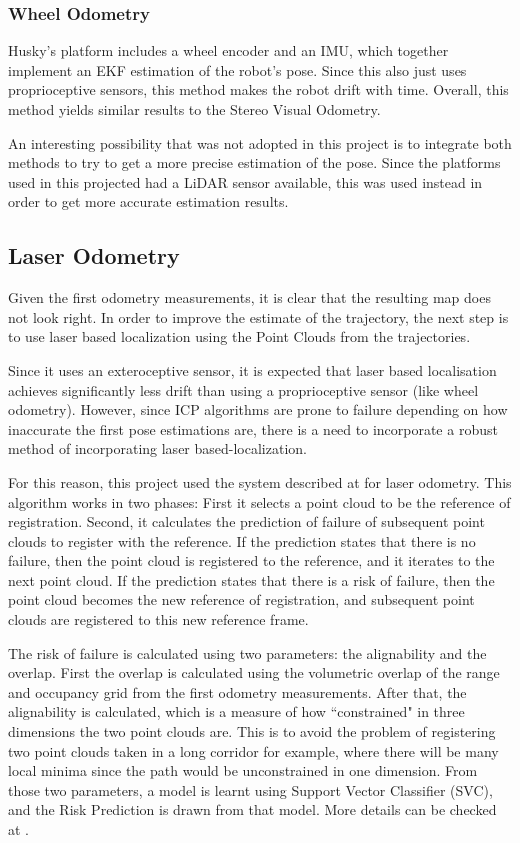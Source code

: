 \documentclass[12pt]{article}
\begin{document}
	\subsubsection*{Wheel Odometry}

Husky's platform includes a wheel encoder and an IMU, which together implement an EKF estimation of the robot's pose. Since this also just uses proprioceptive sensors, this method makes the robot drift with time. Overall, this method yields similar results to the Stereo Visual Odometry.

An interesting possibility that was not adopted in this project is to integrate both methods to try to get a more precise estimation of the pose. Since the platforms used in this projected had a LiDAR sensor available, this was used instead in order to get more accurate estimation results.

	\subsection{Laser Odometry}
	\label{subs:LaserOd}

Given the first odometry measurements, it is clear that the resulting map does not look right. In order to improve the estimate of the trajectory, the next step is to use laser based localization using the Point Clouds from the trajectories.
	
Since it uses an exteroceptive sensor, it is expected that laser based localisation achieves significantly less drift than using a proprioceptive sensor (like wheel odometry). However, since ICP algorithms are prone to failure depending on how inaccurate the first pose estimations are, there is a need to incorporate a robust method of incorporating laser based-localization.
	
For this reason, this project used the system described at \cite{AICPAlign} for laser odometry. This algorithm works in two phases: First it selects a point cloud to be the reference of registration. Second, it calculates the prediction of failure of subsequent point clouds to register with the reference. If the prediction states that there is no failure, then the point cloud is registered to the reference, and it iterates to the next point cloud. If the prediction states that there is a risk of failure, then the point cloud becomes the new reference of registration, and subsequent point clouds are registered to this new reference frame.
	
The risk of failure is calculated using two parameters: the alignability and the overlap. First the overlap is calculated using the volumetric overlap of the range and occupancy grid from the first odometry measurements. After that, the alignability is calculated, which is a measure of how ``constrained" in three dimensions the two point clouds are. This is to avoid the problem of registering two point clouds taken in a long corridor for example, where there will be many local minima since the path would be unconstrained in one dimension. From those two parameters, a model is learnt using Support Vector Classifier (SVC), and the Risk Prediction is drawn from that model. More details can be checked at \cite{AICPAlign}.
	
\end{document}
